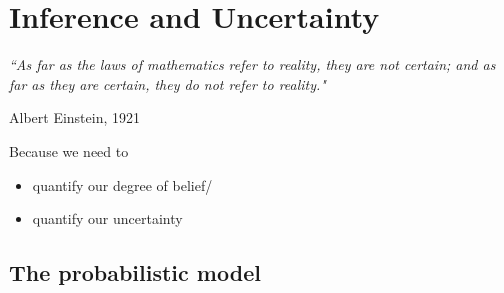 \section{Inference and Uncertainty}

\begin{frame} 

\begin{center} \footnotesize
\textit{``As far as the laws of mathematics refer to reality, they are not certain; and as far as they are certain, they do not refer to reality."}
\end{center} 
\begin{flushright} \footnotesize
Albert Einstein, 1921
\end{flushright}

Because we need to
    \begin{itemize}
    \item[] quantify our degree of belief/\\
	\item[] quantify our uncertainty
    \end{itemize}
    
\end{frame}

\subsection{The probabilistic model}

